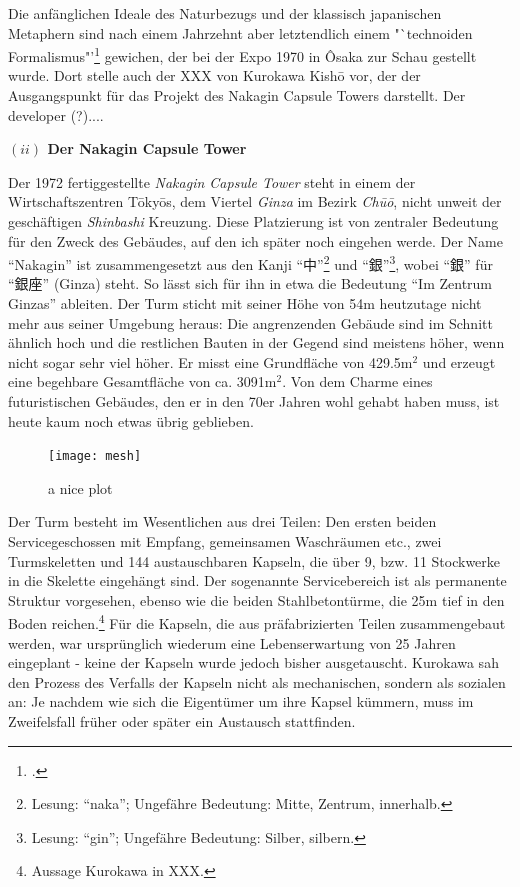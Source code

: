 \documentclass[a4paper, 12pt]{article}
\begin{document}
\begin{onehalfspace}
Die anfänglichen Ideale des Naturbezugs und der klassisch japanischen Metaphern sind nach einem Jahrzehnt aber letztendlich einem "`technoiden Formalismus"’\footnote{\Cite[Siehe][S. 246]{gleiter}.} gewichen, der bei der Expo 1970 in Ôsaka zur Schau gestellt wurde. Dort stelle auch der XXX von Kurokawa Kishō vor, der der Ausgangspunkt für das Projekt des Nakagin Capsule Towers darstellt. Der developer (?).... 




\vspace{5mm}
\noindent\textbf{$(ii)$ Der Nakagin Capsule Tower}

\noindent Der 1972 fertiggestellte \emph{Nakagin Capsule Tower} steht in einem der Wirtschaftszentren Tōkyōs, dem Viertel \emph{Ginza} im Bezirk \emph{Chūō}, nicht unweit der geschäftigen \emph{Shinbashi} Kreuzung. Diese Platzierung ist von zentraler Bedeutung für den Zweck des Gebäudes, auf den ich später noch eingehen werde. Der Name "`Nakagin"' ist zusammengesetzt aus den Kanji "`中"'\footnote{Lesung: "`naka"'; Ungefähre Bedeutung: Mitte, Zentrum, innerhalb.} und "`銀"'\footnote{Lesung: "`gin"'; Ungefähre Bedeutung: Silber, silbern.}, wobei "`銀"' für "`銀座"' (Ginza) steht. So lässt sich für ihn in etwa die Bedeutung "`Im Zentrum Ginzas"' ableiten. Der Turm sticht mit seiner Höhe von 54m heutzutage nicht mehr aus seiner Umgebung heraus: Die angrenzenden Gebäude sind im Schnitt ähnlich hoch und die restlichen Bauten in der Gegend sind meistens höher, wenn nicht sogar sehr viel höher. Er misst eine Grundfläche von 429.5m$^2$ und erzeugt eine begehbare Gesamtfläche von ca. 3091m$^2$. Von dem Charme eines futuristischen Gebäudes, den er in den 70er Jahren wohl gehabt haben muss, ist heute kaum noch etwas übrig geblieben. 


\begin{figure}[h]
    \centering
    \texttt{[image: mesh]}
    \caption{a nice plot}
    \label{fig:mesh1}
\end{figure}

Der Turm besteht im Wesentlichen aus drei Teilen: Den ersten beiden Servicegeschossen mit Empfang, gemeinsamen Waschräumen etc., zwei Turmskeletten und 144 austauschbaren Kapseln, die über 9, bzw. 11 Stockwerke in die Skelette eingehängt sind. Der sogenannte Servicebereich ist als permanente Struktur vorgesehen, ebenso wie die beiden Stahlbetontürme, die 25m tief in den Boden reichen.\footnote{Aussage Kurokawa in XXX.} Für die Kapseln, die aus präfabrizierten Teilen zusammengebaut werden, war ursprünglich wiederum eine Lebenserwartung von 25 Jahren eingeplant - keine der Kapseln wurde jedoch bisher ausgetauscht. Kurokawa sah den Prozess des Verfalls der Kapseln nicht als mechanischen, sondern als sozialen an: Je nachdem wie sich die Eigentümer um ihre Kapsel kümmern, muss im Zweifelsfall früher oder später ein Austausch stattfinden. 


\end{onehalfspace}
\end{document}
